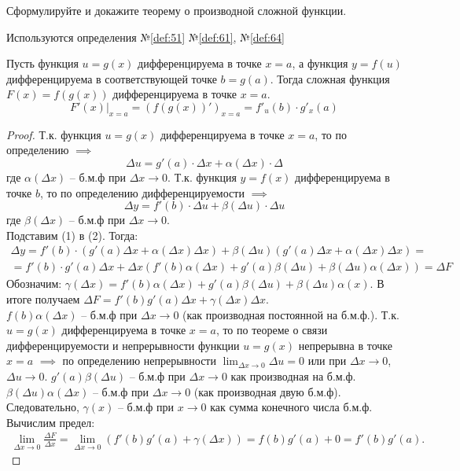 \begin{question}
    Сформулируйте и докажите теорему о производной сложной функции.
\end{question}
\begin{used}
    Используются определения №\ref{def:51} №\ref{def:61}, №\ref{def:64}
\end{used}
\begin{theorem}
    Пусть функция $u = g(x)$ дифференцируема в точке $x = a$, а функция $y = f(u)$ дифференцируема в соответствующей точке  $b = g(a)$.
    Тогда сложная функция $F(x) = f(g(x))$ дифференцируема в точке $x = a$. \[
        F'(x) |_{x = a} = \left(f(g(x))'\right)_{x = a} = f'_u(b) \cdot g'_x(a)
    \]
\end{theorem}
\begin{proof}
    Т.к. функция $u = g(x)$ дифференцируема в точке $x = a$, то по определению $\implies$\[
    \Delta u = g'(a) \cdot \Delta x + \alpha(\Delta x) \cdot \Delta \tag{1}
    \] 
    где $\alpha(\Delta x)$ -- б.м.ф при $\Delta x \to 0$.
    Т.к. функция $y = f(x)$ дифференцируема в точке  $b$, то по определению дифференцируемости  $\implies$ \[
        \Delta y = f'(b) \cdot \Delta u + \beta(\Delta u) \cdot \Delta u \tag{2}
    \] 
    где $\beta(\Delta x)$ -- б.м.ф при $\Delta x \to 0$. \\
    Подставим (1) в (2). Тогда:
    \begin{gather*}
        \Delta y = f'(b) \cdot \left( g'(a) \Delta x + \alpha(\Delta x) \Delta x \right) + \beta(\Delta u)\left( g'(a) \Delta x + \alpha(\Delta x) \Delta x \right) = \\
        = f'(b) \cdot  g'(a) \Delta x + \Delta x\left(f'(b) \alpha(\Delta x) + g'(a) \beta(\Delta u) + \beta(\Delta u) \alpha(\Delta x)\right) = \Delta F
    \end{gather*}
    Обозначим: $\gamma(\Delta x) = f'(b) \alpha(\Delta x) + g'(a) \beta(\Delta u) + \beta(\Delta u) \alpha(x)$. В итоге получаем $\Delta F = f'(b)g'(a)\Delta x + \gamma(\Delta x)\Delta x$. \\
    $f(b) \alpha(\Delta x)$ -- б.м.ф при $\Delta x \to 0$ (как производная постоянной на б.м.ф.). 
    Т.к. $u = g(x)$ дифференцируема в точке $x = a$, то по теореме о связи дифференцируемости и непрерывности функции $u = g(x)$ непрерывна в точке $x = a$  $\implies$ по определению непрерывности $\lim_{\Delta x \to 0} \Delta u = 0$ или при $\Delta x \to 0$, $\Delta u \to 0$. $g'(a) \beta(\Delta u)$ -- б.м.ф при $\Delta x \to  0$ как производная на б.м.ф. $\beta(\Delta u) \alpha(\Delta x)$ -- б.м.ф при $\Delta x \to  0$ (как производная двую б.м.ф).
    Следовательно, $\gamma(x)$ -- б.м.ф при $x \to 0$ как сумма конечного числа б.м.ф. \\
    Вычислим предел:
    \begin{gather*}
        \lim_{\Delta x \to 0} \frac{\Delta F}{\Delta x} = \lim_{\Delta x \to 0} \left( f'(b) g'(a) + \gamma(\Delta x) \right) = f(b)g'(a) + 0 = f'(b) g'(a).
    \end{gather*}
\end{proof}
\pagebreak



